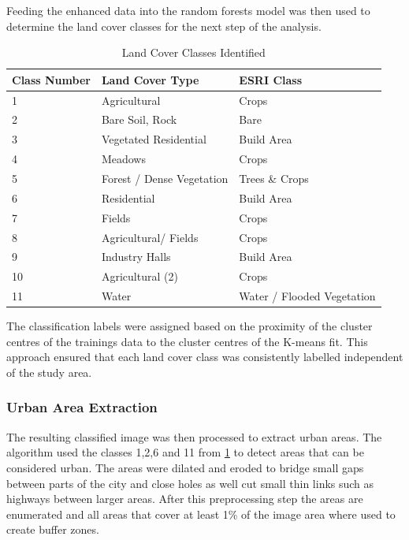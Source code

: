 \documentclass[12pt,a4paper, english,twoside]{article}
\begin{document}
      Feeding the enhanced data into the random forests model was then used to determine the land cover classes for the next step of the analysis.
      \begin{table}[ht]
      \centering
      \renewcommand{\arraystretch}{1.4}
      \caption{Land Cover Classes Identified}\label{tab:land_cover_classes}
      \begin{tabular}{p{1cm}p{4cm}l}
      \toprule
      \textbf{Class Number} & \textbf{Land Cover Type} & \textbf{ESRI Class}\\
      \midrule
      1 &  Agricultural & Crops\\
      2 &  Bare Soil, Rock & Bare \\
      3 &  Vegetated Residential & Build Area\\
      4 &  Meadows & Crops\\
      5 &  Forest / Dense Vegetation & Trees \& Crops \\
      6 &  Residential & Build Area\\
      7 &  Fields & Crops\\
      8 &  Agricultural/ Fields & Crops\\
      9 &  Industry Halls & Build Area\\
      10 &  Agricultural (2) & Crops\\
      11 &  Water& Water / Flooded Vegetation\\
      \bottomrule
      \end{tabular}
      \end{table}

      The classification labels were assigned based on the proximity of the cluster centres of the trainings data to the cluster centres of the K-means fit.
      This approach ensured that each land cover class was consistently labelled independent of the study area.\\
    \subsubsection{Urban Area Extraction}
      The resulting classified image was then processed to extract urban areas.
      The algorithm used the classes 1,2,6 and 11 from \cref{tab:land_cover_classes} to detect areas that can be considered urban.
      The areas were \gls{dilated} and \gls{eroded} to bridge small gaps between parts of the city and close holes as well cut small thin links such as highways between larger areas.
      After this preprocessing step the areas are enumerated and all areas that cover at least 1\% of the image area where used to create buffer zones. 
  
\end{document}

